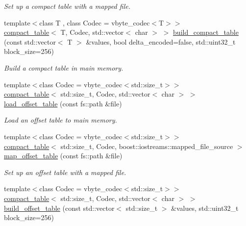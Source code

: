 \begin{DoxyCompactItemize}
\begin{DoxyCompactList}\small\item\em Set up a compact table with a mapped file. \end{DoxyCompactList}\item 
{\footnotesize template$<$class T , class Codec  = vbyte\+\_\+codec$<$\+T$>$$>$ }\\\mbox{\hyperlink{classirk_1_1compact__table}{compact\+\_\+table}}$<$ T, Codec, std\+::vector$<$ char $>$ $>$ \mbox{\hyperlink{namespaceirk_ad911a2a5cd8986d97fd92eec33683377}{build\+\_\+compact\+\_\+table}} (const std\+::vector$<$ T $>$ \&values, bool delta\+\_\+encoded=false, std\+::uint32\+\_\+t block\+\_\+size=256)
\begin{DoxyCompactList}\small\item\em Build a compact table in main memory. \end{DoxyCompactList}\item 
{\footnotesize template$<$class Codec  = vbyte\+\_\+codec$<$std\+::size\+\_\+t$>$$>$ }\\\mbox{\hyperlink{classirk_1_1compact__table}{compact\+\_\+table}}$<$ std\+::size\+\_\+t, Codec, std\+::vector$<$ char $>$ $>$ \mbox{\hyperlink{namespaceirk_ac8015c27262d287ddb9092a9b4278750}{load\+\_\+offset\+\_\+table}} (const fs\+::path \&file)
\begin{DoxyCompactList}\small\item\em Load an offset table to main memory. \end{DoxyCompactList}\item 
{\footnotesize template$<$class Codec  = vbyte\+\_\+codec$<$std\+::size\+\_\+t$>$$>$ }\\\mbox{\hyperlink{classirk_1_1compact__table}{compact\+\_\+table}}$<$ std\+::size\+\_\+t, Codec, boost\+::iostreams\+::mapped\+\_\+file\+\_\+source $>$ \mbox{\hyperlink{namespaceirk_a43eccbe6cba8b0a3168b9bc5065d05b6}{map\+\_\+offset\+\_\+table}} (const fs\+::path \&file)
\begin{DoxyCompactList}\small\item\em Set up an offset table with a mapped file. \end{DoxyCompactList}\item 
{\footnotesize template$<$class Codec  = vbyte\+\_\+codec$<$std\+::size\+\_\+t$>$$>$ }\\\mbox{\hyperlink{classirk_1_1compact__table}{compact\+\_\+table}}$<$ std\+::size\+\_\+t, Codec, std\+::vector$<$ char $>$ $>$ \mbox{\hyperlink{namespaceirk_af80eeaf7666165b73f3c5787bb51e407}{build\+\_\+offset\+\_\+table}} (const std\+::vector$<$ std\+::size\+\_\+t $>$ \&values, std\+::uint32\+\_\+t block\+\_\+size=256)

\end{DoxyCompactItemize}
